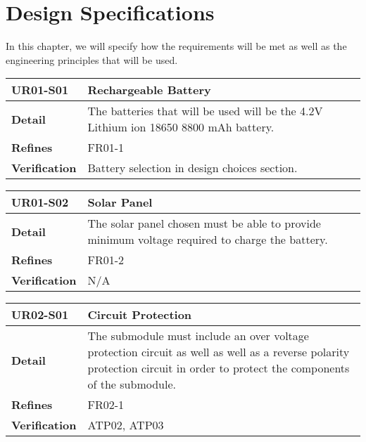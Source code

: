 \documentclass[class=report,11pt,crop=false]{standalone}
\begin{document}
 

\section{Design Specifications}

In this chapter, we will specify how the requirements will be met as well as the engineering principles that will be used.

\begin{table}
\centering

\begin{tabular}{|>{\raggedright\arraybackslash}p{0.2\linewidth}|>{\raggedright\arraybackslash}p{0.8\linewidth}|}
\hline
\textbf{UR01-S01} & \textbf{Rechargeable Battery} \\
\hline
\textbf{Detail} & The batteries that will be used will be the 4.2V Lithium ion 18650 8800 mAh battery.  \\
\hline
\textbf{Refines} & FR01-1 \\
\hline
\textbf{Verification} & Battery selection in design choices section. \\
\hline

\end{tabular}

\end{table}

 

\begin{table}
\centering

\begin{tabular}{|>{\raggedright\arraybackslash}p{0.2\linewidth}|>{\raggedright\arraybackslash}p{0.8\linewidth}|}
\hline
\textbf{UR01-S02} & \textbf{Solar Panel} \\
\hline
\textbf{Detail} & The solar panel chosen must be able to provide minimum voltage required to charge the battery.  \\
\hline
\textbf{Refines} & FR01-2 \\
\hline
\textbf{Verification} & N/A \\
\hline

\end{tabular}

\end{table}

 

\begin{table}
\centering

\begin{tabular}{|>{\raggedright\arraybackslash}p{0.2\linewidth}|>{\raggedright\arraybackslash}p{0.8\linewidth}|}
\hline
\textbf{UR02-S01} & \textbf{Circuit Protection} \\
\hline
\textbf{Detail} & The submodule must include an over voltage protection circuit as well as well as a reverse polarity protection circuit in order to protect the components of the submodule.  \\
\hline
\textbf{Refines} & FR02-1 \\
\hline
\textbf{Verification} & ATP02, ATP03 \\
\hline

\end{tabular}

\end{table}
\end{document}
